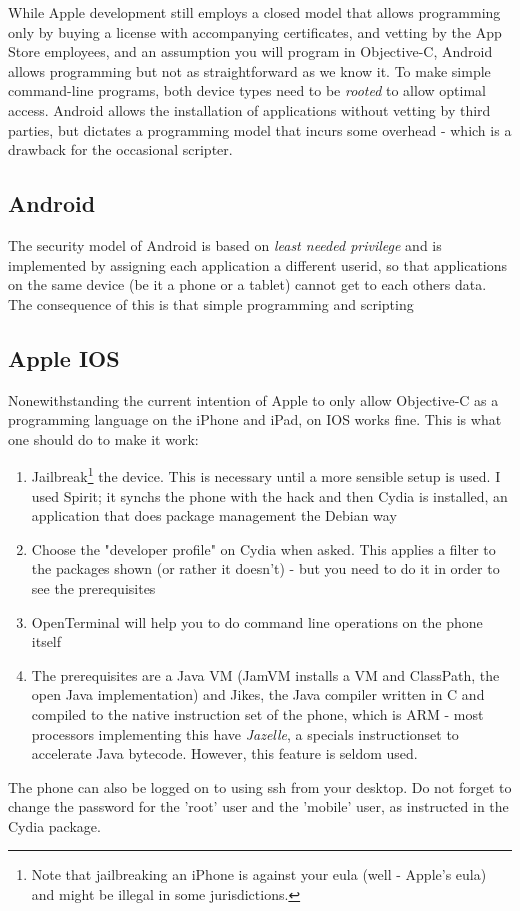 While Apple development still employs a closed model that allows programming only by
buying a license with accompanying certificates, and vetting by the
App Store employees, and an assumption you will program in
Objective-C, Android allows programming but not as straightforward as
we know it. To make simple command-line \nr{} programs, both device
types need to be \emph{rooted} to allow optimal access. Android allows
the installation of applications without vetting by third parties, but
dictates a programming model that incurs some overhead - which is a
drawback for the occasional scripter.
\subsection{Android}
The security model of Android is based on \emph{least needed
  privilege} and is implemented by assigning each application a
different userid, so that applications on the same device (be it a
phone or a tablet) cannot get to each others data. The consequence of
this is that simple \nr{} programming and scripting 
\subsection{Apple IOS}
Nonewithstanding the current intention of Apple to only allow Objective-C
as a programming language on the iPhone and iPad, \nr{} on IOS works fine. This is what one should do to make it work:
\begin{enumerate}
\item Jailbreak\footnote{Note that jailbreaking an iPhone is against your eula (well - Apple's eula) and might be illegal in some jurisdictions.} the device. This is necessary until a more sensible setup is used. I used Spirit; it synchs the phone with the hack and then Cydia is installed, an application that does package management the Debian way
\item Choose the "developer profile" on Cydia when asked. This applies a filter to the packages shown (or rather it doesn't) - but you need to do it in order to see the prerequisites
\item OpenTerminal will help you to do command line operations on the phone itself
\item The prerequisites are a Java VM (JamVM installs a VM and
  ClassPath, the open Java implementation) and Jikes, the Java
  compiler written in C and compiled to the native instruction set of
  the phone, which is ARM - most processors implementing this have
  \emph{Jazelle}, a specials instructionset to accelerate Java
  bytecode. However, this feature is seldom used. 
\end{enumerate}
The phone can also be logged on to using ssh from your desktop. Do not forget to change the password for the 'root' user and the 'mobile' user, as instructed in the Cydia package.

